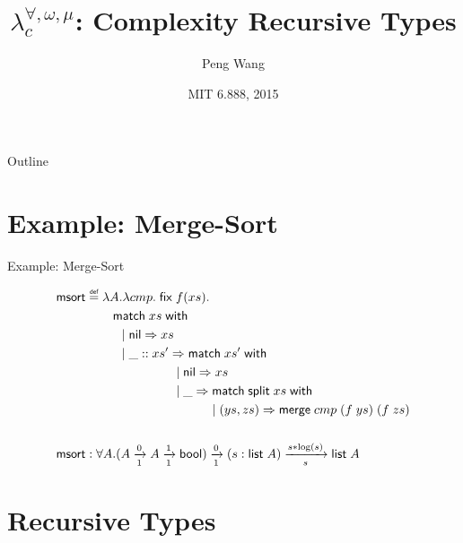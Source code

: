 \documentclass{beamer}
\title
{$\lambda^{\forall,\omega,\mu}_c$: Complexity Recursive Types}
\author
{Peng Wang}
\institute[MIT CSAIL] %
{
  MIT CSAIL
}
\date
{MIT 6.888, 2015}
\newcommand{\arrow}[4]{#1\xrightarrow[#3]{#2}#4}
\newcommand{\symmatch}{\mathsf{match}}
\newcommand{\symwith}{\mathsf{\;with\;}}
\newcommand{\symlist}{\mathsf{list}}
\newcommand{\symnil}{\mathsf{nil}}
\newcommand{\symfix}{\mathsf{fix}}
\newcommand{\symbool}{\mathsf{bool}}
\newcommand{\symmerge}{\mathsf{merge}}
\newcommand{\intro}[2]{(#1 : #2)}
\newcommand{\symmsort}{\mathsf{msort}}
\newcommand{\symsplit}{\mathsf{split}}
\newcommand\defeq{\mathrel{\overset{\makebox[0pt]{\mbox{\normalfont\tiny\sffamily def}}}{=}}}
\begin{document}
\begin{frame}
  \titlepage
\end{frame}

\begin{frame}{Outline}
  \tableofcontents
\end{frame}





\section{Example: Merge-Sort}

\begin{frame}{Example: Merge-Sort}

\begin{align*}
\symmsort &\defeq \lambda A. \lambda cmp.\;\symfix\;f(xs). \\
& \hspace{0.3in} \symmatch\;xs\symwith \\
& \hspace{.4in} |\; \symnil\Rightarrow xs \\
& \hspace{.4in} |\; \_::xs' \Rightarrow \symmatch\;xs'\symwith \\
& \hspace{1in} |\; \symnil\Rightarrow xs \\
& \hspace{1in} |\; \_ \Rightarrow \symmatch\; \symsplit\;xs \symwith \\
& \hspace{1.4in} |\; (ys, zs) \Rightarrow \symmerge\;cmp\;(f\;ys)\;(f\;zs) \\
\\
\symmsort &: \forall A.\arrow{(\arrow{A}{0}{1}{\arrow{A}{1}{1}{\symbool}})}{0}{1}{\arrow{\intro{s}{\symlist\;A}}{s*\log(s)}{s}{\symlist\;A}}
\end{align*}

\section{Recursive Types}

\end{frame}
\end{document}
